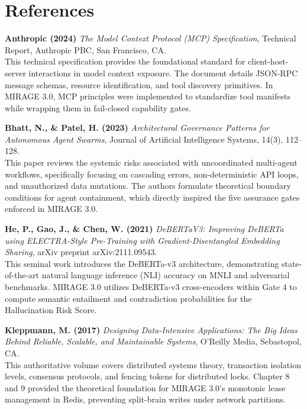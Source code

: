 \documentclass[12pt,a4paper]{report}
\numberwithin{equation}{section}
\begin{document}
\chapter*{References}

\begin{enumerate}[label={[\arabic*]}, leftmargin=2.5em]
    \item \textbf{Anthropic (2024)} \textit{The Model Context Protocol (MCP) Specification}, Technical Report, Anthropic PBC, San Francisco, CA.\\
    This technical specification provides the foundational standard for client-host-server interactions in model context exposure. The document details JSON-RPC message schemas, resource identification, and tool discovery primitives. In MIRAGE 3.0, MCP principles were implemented to standardize tool manifests while wrapping them in fail-closed capability gates.

    \item \textbf{Bhatt, N., \& Patel, H. (2023)} \textit{Architectural Governance Patterns for Autonomous Agent Swarms}, Journal of Artificial Intelligence Systems, 14(3), 112--128.\\
    This paper reviews the systemic risks associated with uncoordinated multi-agent workflows, specifically focusing on cascading errors, non-deterministic API loops, and unauthorized data mutations. The authors formulate theoretical boundary conditions for agent containment, which directly inspired the five assurance gates enforced in MIRAGE 3.0.

    \item \textbf{He, P., Gao, J., \& Chen, W. (2021)} \textit{DeBERTaV3: Improving DeBERTa using ELECTRA-Style Pre-Training with Gradient-Disentangled Embedding Sharing}, arXiv preprint arXiv:2111.09543.\\
    This seminal work introduces the DeBERTa-v3 architecture, demonstrating state-of-the-art natural language inference (NLI) accuracy on MNLI and adversarial benchmarks. MIRAGE 3.0 utilizes DeBERTa-v3 cross-encoders within Gate 4 to compute semantic entailment and contradiction probabilities for the Hallucination Risk Score.

    \item \textbf{Kleppmann, M. (2017)} \textit{Designing Data-Intensive Applications: The Big Ideas Behind Reliable, Scalable, and Maintainable Systems}, O'Reilly Media, Sebastopol, CA.\\
    This authoritative volume covers distributed systems theory, transaction isolation levels, consensus protocols, and fencing tokens for distributed locks. Chapter 8 and 9 provided the theoretical foundation for MIRAGE 3.0's monotonic lease management in Redis, preventing split-brain writes under network partitions.


\end{enumerate}
\end{document}
